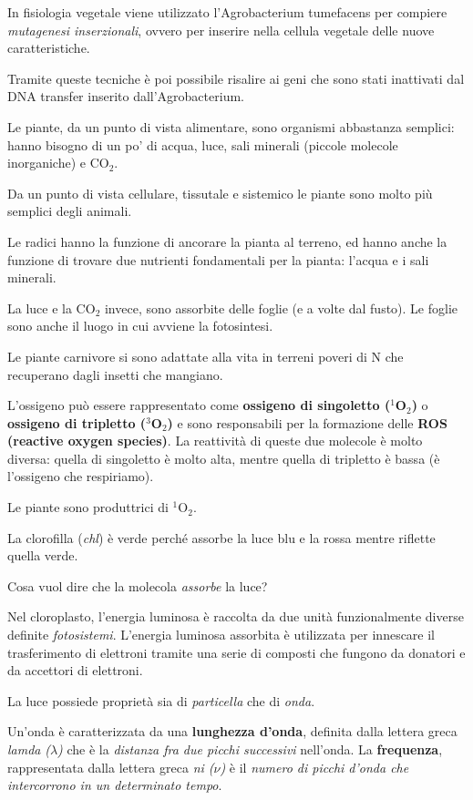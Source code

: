 \documentclass[]{article}
\begin{document}
In fisiologia vegetale viene utilizzato l'Agrobacterium tumefacens per
compiere \emph{mutagenesi inserzionali}, ovvero per inserire nella
cellula vegetale delle nuove caratteristiche.

Tramite queste tecniche è poi possibile risalire ai geni che sono stati
inattivati dal DNA transfer inserito dall'Agrobacterium.

Le piante, da un punto di vista alimentare, sono organismi abbastanza
semplici: hanno bisogno di un po' di acqua, luce, sali minerali (piccole
molecole inorganiche) e CO$_2$.

Da un punto di vista cellulare, tissutale e sistemico le piante sono
molto più semplici degli animali.

Le radici hanno la funzione di ancorare la pianta al terreno, ed hanno
anche la funzione di trovare due nutrienti fondamentali per la pianta:
l'acqua e i sali minerali.

La luce e la CO$_2$ invece, sono assorbite delle foglie (e a volte dal
fusto). Le foglie sono anche il luogo in cui avviene la fotosintesi.

Le piante carnivore si sono adattate alla vita in terreni poveri di N
che recuperano dagli insetti che mangiano.

L'ossigeno può essere rappresentato come \textbf{ossigeno di singoletto
($^1$O$_2$)} o \textbf{ossigeno di tripletto ($^3$O$_2$)} e sono
responsabili per la formazione delle \textbf{ROS (reactive oxygen
species)}. La reattività di queste due molecole è molto diversa: quella
di singoletto è molto alta, mentre quella di tripletto è bassa (è
l'ossigeno che respiriamo).

Le piante sono produttrici di $^1$O$_2$.

La clorofilla (\emph{chl}) è verde perché assorbe la luce blu e la rossa
mentre riflette quella verde.

Cosa vuol dire che la molecola \emph{assorbe} la luce?

Nel cloroplasto, l'energia luminosa è raccolta da due unità
funzionalmente diverse definite \emph{fotosistemi}. L'energia luminosa
assorbita è utilizzata per innescare il trasferimento di elettroni
tramite una serie di composti che fungono da donatori e da accettori di
elettroni.

La luce possiede proprietà sia di \emph{particella} che di \emph{onda}.

Un'onda è caratterizzata da una \textbf{lunghezza d'onda}, definita
dalla lettera greca \emph{lamda} \emph{($\lambda$)} che è la \emph{distanza fra due picchi
successivi} nell'onda. La \textbf{frequenza}, rappresentata dalla lettera
greca \emph{ni ($\nu$)} è il \emph{numero di picchi d'onda che intercorrono in
un determinato tempo}.
\end{document}
